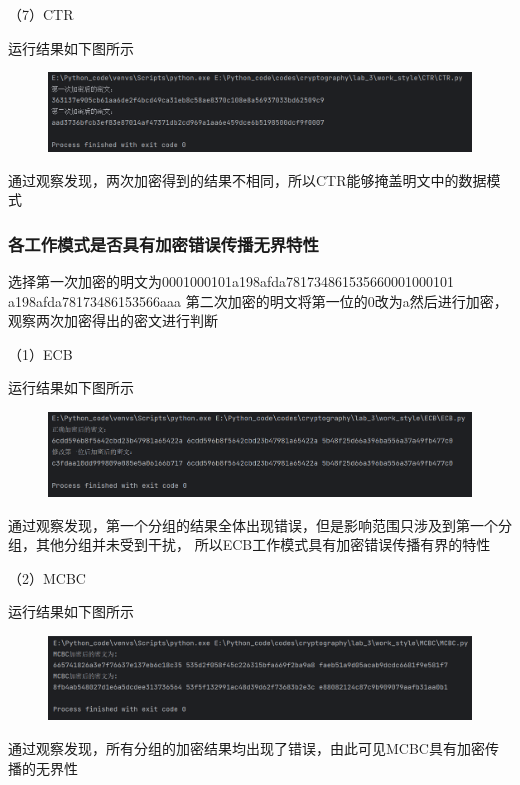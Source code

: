 \documentclass[a4paper,11pt,UTF8]{ctexart}
\newcommand{\bottomcaption}{%
\setlength{\abovecaptionskip}{6pt}%
\setlength{\belowcaptionskip}{6pt}%
\caption}
\newcommand{\xiaowuhao}{\fontsize{9pt}{\baselineskip}\selectfont}   %
\begin{document}
            （7）CTR\par
                运行结果如下图所示
                \begin{figure}[H]
                    \centering
                    \includegraphics[width=13cm]{CTR_result_1.png}
                    \bottomcaption{\xiaowuhao{CTR相同明文加密两次结果}}
                \end{figure}
                通过观察发现，两次加密得到的结果不相同，所以CTR能够掩盖明文中的数据模式\par

        \subsubsection{各工作模式是否具有加密错误传播无界特性}
                选择第一次加密的明文为0001000101a198afda781734861535660001000101\\
                a198afda78173486153566aaa
                第二次加密的明文将第一位的0改为a然后进行加密，观察两次加密得出的密文进行判断\par
\newpage
            （1）ECB\par
                运行结果如下图所示
                \begin{figure}[H]
                    \centering
                    \includegraphics[width=13cm]{ECB_result_2.png}
                    \bottomcaption{\xiaowuhao{ECB修改一位明文两次加密结果}}
                \end{figure}
                通过观察发现，第一个分组的结果全体出现错误，但是影响范围只涉及到第一个分组，其他分组并未受到干扰，
                所以ECB工作模式具有加密错误传播有界的特性\par

            （2）MCBC\par
                运行结果如下图所示
                \begin{figure}[H]
                    \centering
                    \includegraphics[width=13cm]{MCBC_result_2.png}
                    \bottomcaption{\xiaowuhao{MCBC修改一位明文两次加密结果}}
                \end{figure}
                通过观察发现，所有分组的加密结果均出现了错误，由此可见MCBC具有加密传播的无界性\par
\end{document}
